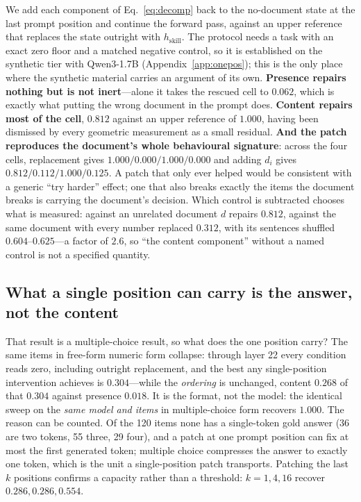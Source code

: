 \documentclass{article}
\newcommand{\dvec}{\ensuremath{d}}
\begin{document}
We add each component of Eq.~\ref{eq:decomp} back to the no-document state at
the last prompt position and continue the forward pass, against an upper
reference that replaces the state outright with $h_{\text{skill}}$. The protocol
needs a task with an exact zero floor and a matched negative control, so it is
established on the synthetic tier with Qwen3-1.7B (Appendix~\ref{app:onepos}); this is the only
place where the synthetic material carries an argument of its own.
\textbf{Presence repairs nothing but is not inert}---alone it takes the rescued
cell to $0.062$, which is exactly what putting the wrong document in the prompt
does. \textbf{Content repairs most of the cell}, $0.812$ against an upper
reference of $1.000$, having been dismissed by every geometric measurement as a
small residual. \textbf{And the patch reproduces the document's whole
behavioural signature}: across the four cells, replacement gives
$1.000/0.000/1.000/0.000$ and adding $\dvec_i$ gives $0.812/0.112/1.000/0.125$.
A patch that only ever helped would be consistent with a generic ``try harder''
effect; one that also breaks exactly the items the document breaks is carrying
the document's decision. Which control is subtracted chooses what is measured:
against an unrelated document $\dvec$ repairs $0.812$, against the same document
with every number replaced $0.312$, with its sentences shuffled
$0.604$--$0.625$---a factor of $2.6$, so ``the content component'' without a
named control is not a specified quantity.

\subsection{What a single position can carry is the answer, not the content}
\label{sec:onepos}

That result is a multiple-choice result, so what does the one position carry?
The same items in free-form numeric form collapse: through layer 22 every
condition reads zero, including outright replacement, and the best any
single-position intervention achieves is $0.304$---while the \emph{ordering} is
unchanged, content $0.268$ of that $0.304$ against presence $0.018$. It is the
format, not the model: the identical sweep on the \emph{same model and items} in
multiple-choice form recovers $1.000$. The reason can be counted. Of the 120
items none has a single-token gold answer (36 are two tokens, 55 three, 29
four), and a patch at one prompt position can fix at most the first generated
token; multiple choice compresses the answer to exactly one token, which is the
unit a single-position patch transports. Patching the last $k$ positions
confirms a capacity rather than a threshold: $k=1,4,16$ recover
$0.286, 0.286, 0.554$.
\end{document}
